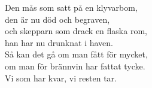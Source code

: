   \begin{vers}
Den mås som satt på en klyvarbom,\\ 
den är nu död och begraven, \\
och skepparn som drack en flaska rom, \\
han har nu drunknat i haven. \\
Så kan det gå om man fått för mycket, \\
om man för brännvin har fattat tycke. \\
Vi som har kvar, vi resten tar. \\
\end{vers}
 